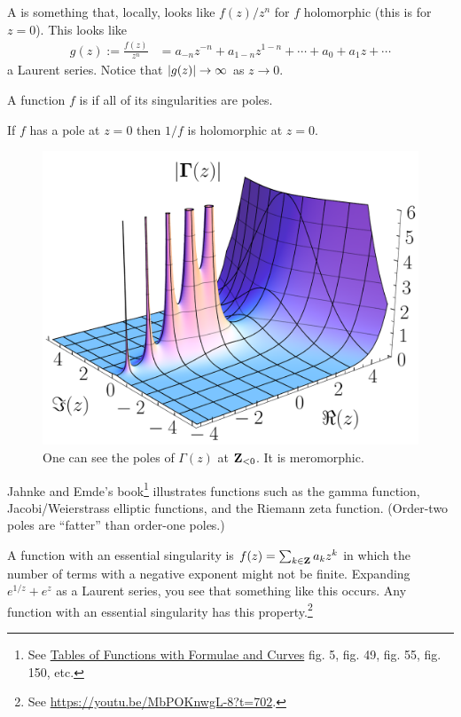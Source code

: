 \documentclass[11pt, oneside,margin=1in]{article}
\begin{document}
A  is something that, locally, looks like $f(z)/z^n$ for $f$ holomorphic (this is for $z=0$). This looks like
 \begin{align*}
	g(z):= \frac{f(z)}{z^n} &= a_{-n}z^{-n} + a_{1-n}z^{1-n} + \cdots + a_0 + a_1z + \cdots
\end{align*}
a Laurent series. Notice that $\left \lvert g(z) \right \rvert \to\infty $ as $z\to 0$. 

\begin{definition}[ ]\label{}\text{}
        A function $f$ is  if all of its singularities are poles.
\end{definition}

If $f$ has a pole at $z=0$ then $1/f$ is holomorphic at $z=0$.

\begin{figure}
	\begin{center}
		\includegraphics[scale=0.2]{abs_gamma}
		\caption{One can see the poles of $\Gamma(z)$ at $\mathbf Z_{<0}$. It is meromorphic.}
	\end{center}
\end{figure}

Jahnke and Emde's book\footnote{See \underline{Tables of Functions with Formulae and Curves} fig. 5, fig. 49, fig. 55, fig. 150, etc.} illustrates functions such as the gamma function, Jacobi/Weierstrass elliptic functions, and the Riemann zeta function. (Order-two poles are ``fatter'' than order-one poles.)

A function with an essential singularity is $f(z)=\sum_{k\in \mathbf Z}a_kz^k$ in which the number of terms with a negative exponent might not be finite. Expanding $e^{1/z} +e^z$ as a Laurent series, you see that something like this occurs. Any function with an essential singularity has this property.\footnote{See \url{https://youtu.be/MbPOKnwgL-8?t=702}.}
\end{document}
